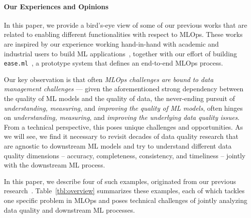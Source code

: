 \documentclass[11pt]{article}
\begin{document}
\vspace{-0.5em}
\paragraph*{Our Experiences and Opinions} 
In this paper, we 
provide a bird's-eye view 
of some of our previous 
works that are related to
enabling different functionalities with respect to MLOps. These works are 
inspired by our experience working hand-in-hand with academic and industrial users to build
ML applications~\cite{schawinski2017generative, su2018generative, sartori2018model, stark2018psfgan, ackermann2018using, schawinski2018exploring, girardi2018patient, glaser2019radiogan, beck2019sensing, sartori2019forward}, together with  
our effort of building 
\texttt{ease.ml}~\cite{aguilar2021ease}, a prototype
system that defines an 
end-to-end MLOps process.

Our key observation is 
that often \textit{
MLOps challenges are bound to
data management challenges} --- 
given the aforementioned 
strong dependency 
between the quality of 
ML models and the quality of data, the never-ending
pursuit of \textit{understanding,
measuring}, and \textit{improving the
quality of ML models},
often hinges on 
\textit{understanding,
measuring}, and \textit{improving
the underlying 
data quality issues}.
From a technical perspective, this poses 
unique challenges and opportunities.
As we will see, we find it necessary to 
revisit decades of 
data quality research
that are agnostic to 
downstream ML models and 
try to 
understand different 
data quality dimensions -- accuracy, completeness,
consistency, and timeliness -- jointly with the downstream ML process. 

In this paper, we describe 
four of such examples, originated from our 
previous research~\cite{karlavs2020nearest, renggli2020automatic, karimi2020online, renggli2019continuous}.
Table~\ref{tbl:overview}
summarizes 
these examples, each of which tackles one
specific problem in MLOps and
poses technical challenges 
of jointly analyzing data quality 
and downstream ML processes.
\end{document}
